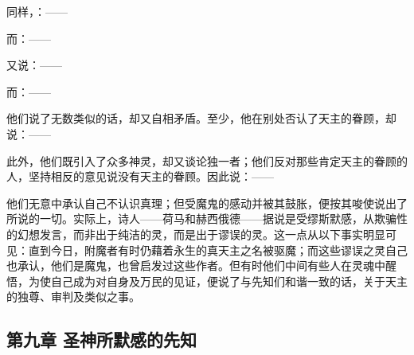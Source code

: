 同样，：——\par

\par

而：——\par

\par

又说：——\par

\par

而：——\par

\par

他们说了无数类似的话，却又自相矛盾。至少，他在别处否认了天主的眷顾，却说：——\par

\par

此外，他们既引入了众多神灵，却又谈论独一者；他们反对那些肯定天主的眷顾的人，坚持相反的意见说没有天主的眷顾。因此说：——\par

\par

他们无意中承认自己不认识真理；但受魔鬼的感动并被其鼓胀，便按其唆使说出了所说的一切。实际上，诗人——荷马和赫西俄德——据说是受缪斯默感，从欺骗性的幻想发言，而非出于纯洁的灵，而是出于谬误的灵。这一点从以下事实明显可见：直到今日，附魔者有时仍藉着永生的真天主之名被驱魔；而这些谬误之灵自己也承认，他们是魔鬼，也曾启发过这些作者。但有时他们中间有些人在灵魂中醒悟，为使自己成为对自身及万民的见证，便说了与先知们和谐一致的话，关于天主的独尊、审判及类似之事。\par


\subsection{第九章 圣神所默感的先知}

